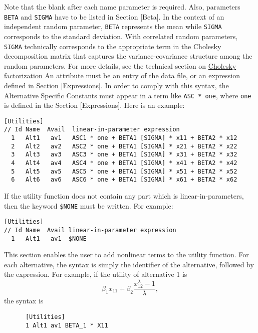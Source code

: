 \documentclass[12pt]{memoir}
\begin{document}
\begin{description}
\begin{enumerate}
         Note that the blank after each name parameter is required. Also,
         parameters \verb+BETA+ and \verb+SIGMA+ have to be listed in
         Section [Beta]. In the context of an independent random parameter, 
         \verb+BETA+ represents the mean while \verb+SIGMA+ corresponds to the standard deviation. 
         With correlated random parameters, \verb+SIGMA+ technically corresponds to the appropriate term 
         in the Cholesky decomposition matrix that captures the variance-covariance structure among 
         the random parameters. For more details, see the technical section on \hyperlink{Cholesky factorization}{Cholesky factorization}
         An attribute must be an entry of the data file,
         or an expression defined in Section [Expressions].
         In order to comply with this syntax, the  Alternative Specific Constants must
         appear in a term like \verb+ASC * one+, where \verb+one+ is defined in the Section [Expressions].
         Here is an example:
         \small 
{\footnotesize
\begin{verbatim}
[Utilities]
// Id Name  Avail  linear-in-parameter expression
  1   Alt1   av1   ASC1 * one + BETA1 [SIGMA] * x11 + BETA2 * x12
  2   Alt2   av2   ASC2 * one + BETA1 [SIGMA] * x21 + BETA2 * x22
  3   Alt3   av3   ASC3 * one + BETA1 [SIGMA] * x31 + BETA2 * x32
  4   Alt4   av4   ASC4 * one + BETA1 [SIGMA] * x41 + BETA2 * x42
  5   Alt5   av5   ASC5 * one + BETA1 [SIGMA] * x51 + BETA2 * x52
  6   Alt6   av6   ASC6 * one + BETA1 [SIGMA] * x61 + BETA2 * x62
\end{verbatim}
}
         \normalsize
         
         If the utility function does not contain any part which is
         linear-in-parameters, then the keyword \verb+$NONE+ must be
         written. For example:
         \footnotesize
{\footnotesize
         \begin{verbatim}
[Utilities]
// Id Name  Avail linear-in-parameter expression
  1   Alt1   av1  $NONE
\end{verbatim}
}
         \normalsize
     \end{enumerate}
  
   \item[\specitem{GeneralizedUtilities}] 
      This section enables the user to add nonlinear terms to the utility
      function. For each alternative, the syntax is simply the identifier of the
      alternative, followed by the expression.  For example, if the utility
      of alternative 1 is 
      \[
      \beta_1 x_{11} + \beta_2 \frac{x_{12}^\lambda-1}{\lambda}, 
      \] 
      the syntax
      is 
      \footnotesize
{\footnotesize
      \begin{verbatim}
      [Utilities]
      1 Alt1 av1 BETA_1 * X11


\end{verbatim}}
\end{description}
\end{document}
